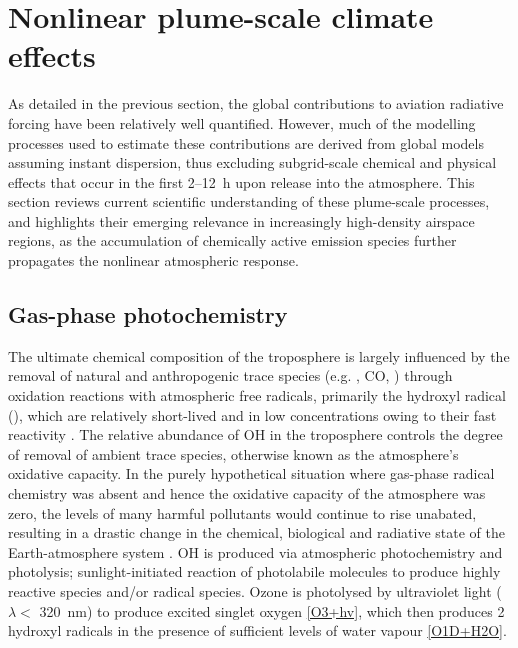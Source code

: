 \section{Nonlinear plume-scale climate effects}
As detailed in the previous section, the global contributions to aviation radiative forcing have been relatively well quantified. However, much of the modelling processes used to estimate these contributions are derived from global models assuming instant dispersion, thus excluding subgrid-scale chemical and physical effects that occur in the first 2--12~h upon release into the atmosphere. This section reviews current scientific understanding of these plume-scale processes, and highlights their emerging relevance in increasingly high-density airspace regions, as the accumulation of chemically active emission species further propagates the nonlinear atmospheric response.

\subsection{Gas-phase photochemistry}
\label{Gas-phase_photochem}
The ultimate chemical composition of the troposphere is largely influenced by the removal of natural and anthropogenic trace species (e.g. , CO, ) through oxidation reactions with atmospheric free radicals, primarily the hydroxyl radical (), which are relatively short-lived and in low concentrations owing to their fast reactivity \cite{Stone2012, Monks2005}. The relative abundance of OH in the troposphere controls the degree of removal of ambient trace species, otherwise known as the atmosphere's oxidative capacity. In the purely hypothetical situation where gas-phase radical chemistry was absent and hence the oxidative capacity of the atmosphere was zero, the levels of many harmful pollutants would continue to rise unabated, resulting in a drastic change in the chemical, biological and radiative state of the Earth-atmosphere system \cite{Prinn2003}. OH is produced via atmospheric photochemistry and photolysis; sunlight-initiated reaction of photolabile molecules to produce highly reactive species and/or radical species. Ozone is photolysed by ultraviolet light ($\lambda <$ 320~nm) to produce excited singlet oxygen  \eqref{O3+hv}, which then produces 2 hydroxyl radicals in the presence of sufficient levels of water vapour \eqref{O1D+H2O}. 


